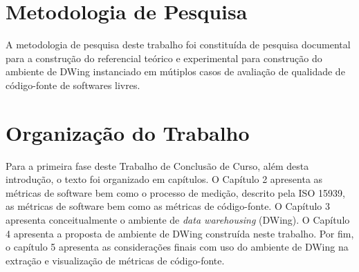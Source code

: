 
\section {Metodologia de Pesquisa}

A metodologia de pesquisa deste trabalho foi constituída de pesquisa documental para a construção do referencial teórico e experimental para construção do ambiente de DWing instanciado em mútiplos casos de avaliação de qualidade de código-fonte de softwares livres. 

\section{Organização do Trabalho}

Para a primeira fase deste Trabalho de Conclusão de Curso, além desta 
introdução, o texto foi organizado em capítulos. O Capítulo 2 apresenta as 
métricas de software bem como o processo de medição, descrito pela ISO 15939, 
as métricas de software bem como as métricas de código-fonte. O Capítulo 3 
apresenta conceitualmente o ambiente de \textit{data warehousing} (DWing). O 
Capítulo 4 apresenta a proposta de ambiente de DWing construída neste 
trabalho. Por fim, o capítulo 5 apresenta as considerações finais com uso do 
ambiente de DWing na extração e visualização de métricas de código-fonte. 
